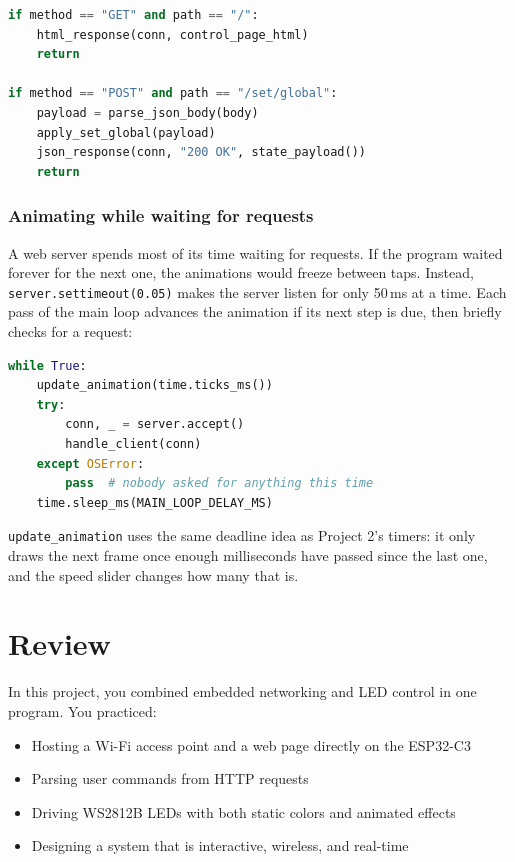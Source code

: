 \begin{lstlisting}[language=Python, caption=Choosing what to do with a request]
if method == "GET" and path == "/":
    html_response(conn, control_page_html)
    return

if method == "POST" and path == "/set/global":
    payload = parse_json_body(body)
    apply_set_global(payload)
    json_response(conn, "200 OK", state_payload())
    return
\end{lstlisting}

\subsubsection{Animating while waiting for requests}
A web server spends most of its time waiting for requests. If the program waited forever for the
next one, the animations would freeze between taps. Instead, \texttt{server.settimeout(0.05)} makes
the server listen for only 50\,ms at a time. Each pass of the main loop advances the animation if
its next step is due, then briefly checks for a request:

\begin{lstlisting}[language=Python, caption=The main loop (simplified)]
while True:
    update_animation(time.ticks_ms())
    try:
        conn, _ = server.accept()
        handle_client(conn)
    except OSError:
        pass  # nobody asked for anything this time
    time.sleep_ms(MAIN_LOOP_DELAY_MS)
\end{lstlisting}

\texttt{update\_animation} uses the same deadline idea as Project 2's timers: it only draws the
next frame once enough milliseconds have passed since the last one, and the speed slider changes
how many that is.

\section{Review}
In this project, you combined embedded networking and LED control in one program. You practiced:
\begin{itemize}
    \item Hosting a Wi-Fi access point and a web page directly on the ESP32-C3
    \item Parsing user commands from HTTP requests
    \item Driving WS2812B LEDs with both static colors and animated effects
    \item Designing a system that is interactive, wireless, and real-time
\end{itemize}

